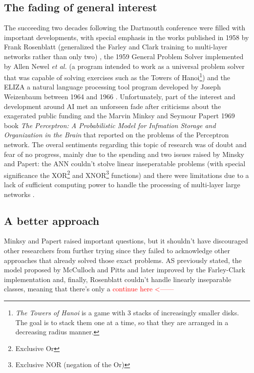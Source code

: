 \documentclass[12pt]{article}
\newcommand{\red}[1]{\textcolor{red}{#1}} %
\begin{document}
\subsection{The fading of general interest}
\par The succeeding two decades following the Dartmouth conference were filled with important developments, with special emphasis in the works published in 1958 by Frank Rosenblatt (generalized the Farley and Clark training to multi-layer networks rather than only two) \autocite{rosenblattPerceptronProbabilisticModel1958}, the 1959 General Problem Solver implemented by Allen Newel \textit{et al.} (a program intended to work as a universal problem solver that was capable of solving exercises such as the Towers of Hanoi\footnote{\textit{The Towers of Hanoi} is a game with 3 stacks of increasingly smaller disks. The goal is to stack them one at a time, so that they are arranged in a decreasing radius manner.}) \autocite{newell1959report} and the ELIZA a natural language processing tool program developed by Joseph Weizenbaum between 1964 and 1966 \autocite{weizenbaumELIZAComputerProgram1966}. Unfortunately, part of the interest and development around AI met an unforseen fade after criticisms about the exagerated public funding \autocite{haenleinBriefHistoryArtificial2019} and the Marvin Minksy and Seymour Papert 1969 book \textit{The Perceptron: A Probabilistic Model for Infmation Storage and Organization in the Brain} that reported on the problems of the Perceptron network. The overal sentiments regarding this topic of research was of doubt and fear of no progress, mainly due to the spending and two issues raised by Minsky and Papert: the ANN couldn't stolve linear inseperatable problems (with special significance the XOR\footnote{Exclusive Or} and XNOR\footnote[3]{Exclusive NOR (negation of the Or)} functions) and there were limitations due to a lack of sufficient computing power to handle the processing of multi-layer large networks \autocite{minsky69perceptrons}.

\subsection{A better approach}
Minksy and Papert raised important questions, but it shouldn't have discouraged other researchers from further trying since they failed to acknowledge other approaches that already solved those exact problems. AS previously stated, the model proposed by McCulloch and Pitts and later improved by the Farley-Clark implementation and, finally, Rosenblatt couldn't handle linearly inseparable classes, meaning that there's only a \red{continue here <------}
\end{document}
